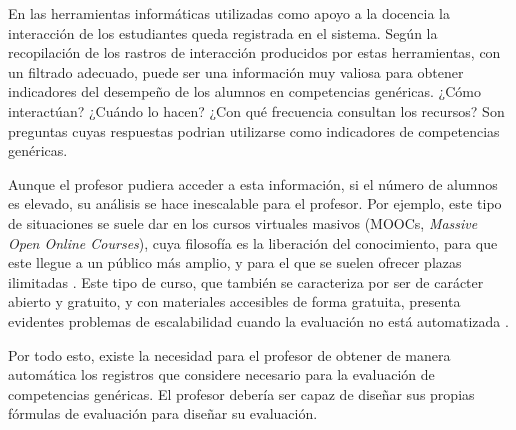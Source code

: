 En las herramientas informáticas utilizadas como apoyo a la docencia la interacción de los estudiantes queda registrada en el sistema. Según \cite{Chebil:2012, Florian:2011} la recopilación de los rastros de interacción producidos por estas herramientas, con un filtrado adecuado, puede ser una información muy valiosa para obtener indicadores del desempeño de los alumnos en competencias genéricas. ¿Cómo interactúan? ¿Cuándo lo hacen? ¿Con qué frecuencia consultan los recursos? Son preguntas cuyas respuestas podrian utilizarse como indicadores de competencias genéricas.

Aunque el profesor pudiera acceder a esta información, si el número de alumnos es elevado, su análisis se hace inescalable para el profesor. Por ejemplo, este tipo de situaciones se suele dar en los cursos virtuales masivos (MOOCs, \emph{Massive Open Online Courses}), cuya filosofía es la liberación del conocimiento, para que este llegue a un público más amplio, y para el que se suelen ofrecer plazas ilimitadas \cite{Lugton:2012, Mor:2013}. Este tipo de curso, que también se caracteriza por ser de carácter abierto y gratuito, y con materiales accesibles de forma gratuita, presenta evidentes problemas de escalabilidad cuando la evaluación no está automatizada \cite{Johnson:2013}.

Por todo esto, existe la necesidad para el profesor de obtener de manera automática los registros que considere necesario para la evaluación de competencias genéricas. El profesor debería ser capaz de diseñar sus propias fórmulas de evaluación para diseñar su evaluación.





